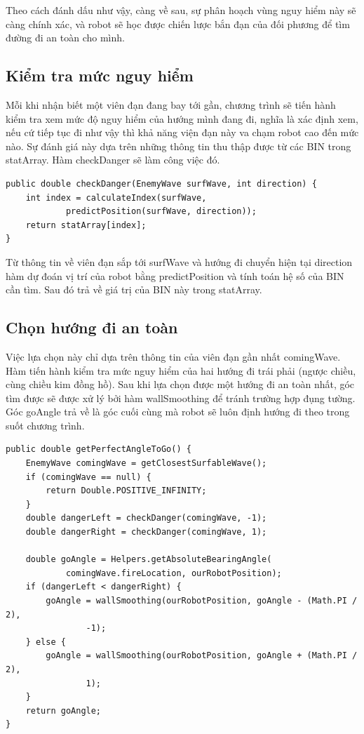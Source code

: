 \documentclass[14pt]{article}
\begin{document}
Theo cách đánh dấu như vậy, càng về sau, sự phân hoạch vùng nguy hiểm này sẽ càng chính xác, và robot sẽ học được chiến lược bắn đạn của đối phương để tìm đường đi an toàn cho mình.
\subsection{Kiểm tra mức nguy hiểm}
Mỗi khi nhận biết một viên đạn đang bay tới gần, chương trình sẽ tiến hành kiểm tra xem mức độ nguy hiểm của hướng mình đang đi, nghĩa là xác định xem, nếu cứ tiếp tục đi như vậy thì khả năng viện đạn này va chạm robot cao đến mức nào. Sự đánh giá này dựa trên những thông tin thu thập được từ các BIN trong statArray. Hàm checkDanger sẽ làm công việc đó.
\begin{lstlisting}[caption = checkDanger, frame = single]
public double checkDanger(EnemyWave surfWave, int direction) {
	int index = calculateIndex(surfWave,
			predictPosition(surfWave, direction));
	return statArray[index];
}
\end{lstlisting}
Từ thông tin về viên đạn sắp tới surfWave và hướng đi chuyển hiện tại direction hàm dự đoán vị trí của robot bằng predictPosition và tính toán hệ số của BIN cần tìm. Sau đó trả về giá trị của BIN này trong statArray.
\subsection{Chọn hướng đi an toàn}
Việc lựa chọn này chỉ dựa trên thông tin của viên đạn gần nhất comingWave. Hàm tiến hành kiểm tra mức nguy hiểm của hai hướng đi trái phải (ngược chiều, cùng chiều kim đồng hồ). Sau khi lựa chọn được một hướng đi an toàn nhất, góc tìm được sẽ được xử lý bởi hàm wallSmoothing để tránh trường hợp đụng tường. Góc goAngle trả về là góc cuối cùng mà robot sẽ luôn định hướng đi theo trong suốt chương trình.
\begin{lstlisting}[caption = getPerfectAngleToGo, frame = single]
public double getPerfectAngleToGo() {
	EnemyWave comingWave = getClosestSurfableWave();
	if (comingWave == null) {
		return Double.POSITIVE_INFINITY;
	}
	double dangerLeft = checkDanger(comingWave, -1);
	double dangerRight = checkDanger(comingWave, 1);

	double goAngle = Helpers.getAbsoluteBearingAngle(
			comingWave.fireLocation, ourRobotPosition);
	if (dangerLeft < dangerRight) {
		goAngle = wallSmoothing(ourRobotPosition, goAngle - (Math.PI / 2),
				-1);
	} else {
		goAngle = wallSmoothing(ourRobotPosition, goAngle + (Math.PI / 2),
				1);
	}
	return goAngle;
}
\end{lstlisting}
\end{document}
